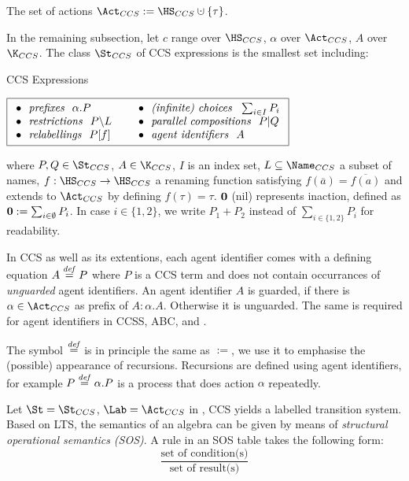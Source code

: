 \documentclass[adraft,hidelinks]{eptcs}
\begin{document}
The set of actions $\Act_{CCS} := \HS_{CCS} \dcup \{\tau\}$.

In the remaining subsection, let $c$ range over $\HS_{CCS}$, $\alpha$ over $\Act_{CCS}$, $A$ over $\K_{CCS}$.
The class $\Sccs$ of CCS expressions is the smallest set including:
\begin{table}[h]
\centering
\caption{CCS Expressions}
\label{CCSExp}
$\boxed{
  \begin{array}{ll}
    \bullet\ \  \text{\emph{prefixes\ \ }} \alpha.P &
    \hspace{5mm}\bullet\ \  \text{\emph{(infinite) choices\ \ }}  \sum_{i\in I} P_i \\
    \bullet\ \  \text{\emph{restrictions\ \ }} P\backslash L &
    \hspace{5mm}\bullet\ \  \text{\emph{parallel compositions\ \ }}  P|Q \\
    \bullet\ \  \text{\emph{relabellings\ \ }}  P[f] &
    \hspace{5mm}\bullet\ \  \text{\emph{agent identifiers\ \ }} A
  \end{array}}$
\end{table}

\noindent where $P, Q\in\Sccs$, $A\in\K_{CCS}$, $I$ is an index set, $L\subseteq \Name_{CCS}$ a subset of names, $f: \HS_{CCS}\to\HS_{CCS}$ a renaming function satisfying $f(\overline{a}) = \overline{f(a)}$ and extends to $\Act_{CCS}$ by defining $f(\tau) = \tau$.
$\textbf{0}$ (nil) represents inaction, defined as $\textbf{0} := \sum_{i\in \emptyset} P_i$.
In case $i\in\{1,2\}$, we write $P_1+P_2$ instead of $\sum_{i\in\{1,2\}}P_i$ for readability.

In CCS as well as its extentions, each agent identifier comes with a defining equation $A \stackrel{{\it def}}{=} P$ where $P$ is a CCS term and does not contain occurrances of \emph{unguarded} agent identifiers.
An agent identifier $A$ is guarded, if there is $\alpha\in\Act_{CCS}$ as prefix of $A: \alpha.A$.
Otherwise it is unguarded.
The same is required for agent identifiers in CCSS, ABC, and \CSG.

The symbol $\stackrel{{\it def}}{=}$ is in principle the same as $:=$, we use it to emphasise the (possible) appearance of recursions.
Recursions are defined using agent identifiers, for example $P \stackrel{{\it def}}{=} \alpha.P$ is a process that does action $\alpha$ repeatedly.


Let $\St=\St_{CCS}$, $\Lab=\Act_{CCS}$ in , CCS yields a labelled transition system.
Based on LTS, the semantics of an algebra can be given by means of \emph{structural operational semantics (SOS)}.
A rule in an SOS table takes the following form:
\[ \frac{\text{set of condition(s)}}{\text{set of result(s)}}\]
\end{document}
